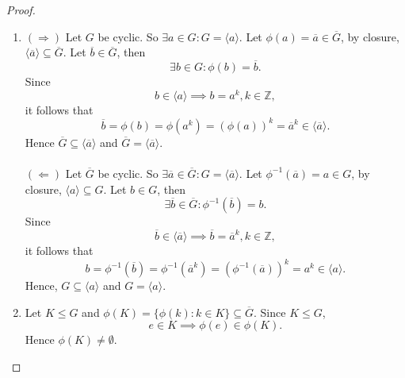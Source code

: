 \documentclass{article}
\theoremstyle{definition}
\begin{document}
\begin{proof}
\begin{enumerate}[label=(\roman*)]
         \item $(\Rightarrow)$ Let $G$ be cyclic. So $\exists a \in G: G = \langle a \rangle$. Let $\phi(a) = \overline{a} \in \overline{G}$, by closure, $\langle \overline{a} \rangle \subseteq \overline{G}$. Let $\overline{b} \in \overline{G}$, then
         \begin{equation*}
             \exists b \in G: \phi(b) = \overline{b}.
         \end{equation*}
         Since
         \begin{equation*}
             b \in \langle a\rangle \implies b = a^k, k \in \mathbb{Z},
         \end{equation*}
         it follows that
         \begin{equation*}
             \overline{b} = \phi(b) = \phi(a^k) = (\phi(a))^k = \overline{a}^k \in \langle \overline{a} \rangle.
         \end{equation*}
         Hence $\overline{G} \subseteq \langle \overline{a} \rangle$ and $\overline{G} = \langle \overline{a} \rangle$.
         \\ \\
         $(\Leftarrow)$ Let $\overline{G}$ be cyclic. So $\exists \overline{a} \in \overline{G}: G = \langle \overline{a} \rangle$. Let $\phi^{-1}(\overline{a}) = a \in G$, by closure, $\langle a \rangle \subseteq G$. Let $b \in G$, then
         \begin{equation*}
             \exists \overline{b} \in \overline{G}: \phi^{-1}(\overline{b}) = b.
         \end{equation*}
         Since 
         \begin{equation*}
             \overline{b} \in \langle \overline{a} \rangle \implies \overline{b} = \overline{a}^k, k \in \mathbb{Z},
         \end{equation*}
         it follows that
         \begin{equation*}
             b = \phi^{-1}(\overline{b}) = \phi^{-1}(\overline{a}^k) = (\phi^{-1}(\overline{a}))^k = a^k \in \langle a \rangle.
         \end{equation*}
         Hence, $G \subseteq \langle a \rangle$ and $G = \langle a \rangle$.
         
         \item Let $K \leq G$ and $\phi(K) = \{\phi(k): k \in K\} \subseteq \overline{G}$. Since $K \leq G$, 
         \begin{equation*}
             e \in K \implies \phi(e) \in \phi(K).
         \end{equation*}
          Hence $\phi(K) \neq \emptyset$.
          

\end{enumerate}
\end{proof}
\end{document}
